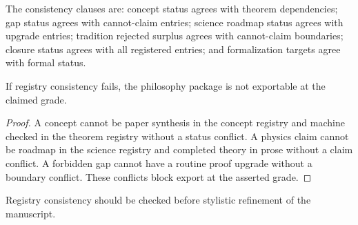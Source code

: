\begin{definition}
\label{def:philosophy-registry-consistency-clauses}
The consistency clauses are: concept status agrees with theorem
dependencies; gap status agrees with cannot-claim entries; science
roadmap status agrees with upgrade entries; tradition rejected surplus
agrees with cannot-claim boundaries; closure status agrees with all
registered entries; and formalization targets agree with formal
status.
\end{definition}

\begin{theorem}
\label{thm:philosophy-registry-consistency-necessary}
If registry consistency fails, the philosophy package is not exportable
at the claimed grade.
\end{theorem}
\begin{proof}
A concept cannot be paper synthesis in the concept registry and
machine checked in the theorem registry without a status conflict. A
physics claim cannot be roadmap in the science registry and completed
theory in prose without a claim conflict. A forbidden gap cannot have a
routine proof upgrade without a boundary conflict. These conflicts
block export at the asserted grade.
\end{proof}

\begin{corollary}
\label{cor:philosophy-consistency-before-polish}
Registry consistency should be checked before stylistic refinement of
the manuscript.
\end{corollary}


